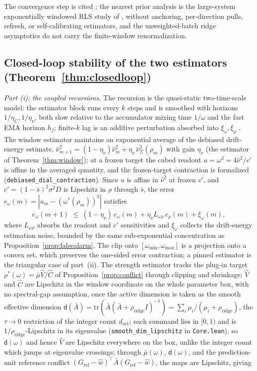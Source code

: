 The convergence step is cited \citep{silverstein1995,rubio2011,hachem2007}; the nearest prior analysis is the large-system exponentially windowed RLS study of \citet{xiao2005}, without anchoring, per-direction pulls, refresh, or self-calibrating estimators, and the unweighted-batch ridge asymptotics \citep{hastie2022,pafka2004} do not carry the finite-window renormalization.

\subsection{Closed-loop stability of the two estimators (Theorem~\ref{thm:closedloop})}

\emph{Part (i): the coupled recursions.}
The recursion is the quasi-static two-time-scale model: the estimator block runs every $k$ steps and is smoothed with horizons $1/\eta_C, 1/\eta_\nu$, both slow relative to the accumulator mixing time $1/\omega$ and the fast EMA horizon $h_f$; finite-$k$ lag is an additive perturbation absorbed into $\xi_\omega, \xi_\rho$ \citep{borkar2008,benveniste1990,kushner2003}.
The window estimator maintains an exponential average of the debiased drift-energy estimate, $\widehat\nu^2_{m+1} = (1-\eta_\nu)\widehat\nu^2_m + \eta_\nu\,\widehat\nu^2_\Sigma(\rho_m)$ with gain $\eta_\nu$ (the estimator of Theorem~\ref{thm:window}); at a frozen target the cubed readout $u = \omega^3 = 4\widehat\nu^2/c'$ is affine in the averaged quantity, and the frozen-target contraction is formalized (\texttt{debiased\_dial\_contraction}).
Since $u$ is affine in $\widehat\nu^2$ at frozen $c'$, and $c' = (1-\bar s)^2\sigma^2D$ is Lipschitz in $\rho$ through $\bar s$, the error $e_\omega(m) = |u_m - (\omega^*(\rho_m))^3|$ satisfies
\[
e_\omega(m{+}1) \;\le\; (1-\eta_\nu)\,e_\omega(m) + \eta_\nu L_{\omega\rho}\, e_\rho(m) + \xi_\omega(m),
\]
where $L_{\omega\rho}$ absorbs the readout and $c'$ sensitivities and $\xi_\omega$ collects the drift-energy estimation noise, bounded by the same sub-exponential concentration as Proposition~\ref{prop:falsealarm}.
The clip onto $[\omega_{\min}, \omega_{\max}]$ is a projection onto a convex set, which preserves the one-sided error contraction; a pinned estimator is the triangular case of part~(ii).
The strength estimator tracks the plug-in target $\rho^*(\omega) = \bar\mu\widehat V/\widehat C$ of Proposition~\ref{prop:conflict} through clipping and shrinkage; $\widehat V$ and $\widehat C$ are Lipschitz in the window coordinate on the whole parameter box, with no spectral-gap assumption, once the active dimension is taken as the smooth effective dimension $\mathsf d(\bar A) = \mathrm{tr}(\bar A(\bar A+\rho_{\mathrm{ridge}}I)^{-1}) = \sum_i \mu_i/(\mu_i+\rho_{\mathrm{ridge}})$, the $\tau \to 0$ restriction of the integer count $d_{\mathrm{act}}$; each summand lies in $[0,1)$ and is $1/\rho_{\mathrm{ridge}}$-Lipschitz in its eigenvalue (\texttt{smooth\_dim\_lipschitz} in \texttt{Core.lean}), so $\mathsf d(\omega)$ and hence $\widehat V$ are Lipschitz everywhere on the box, unlike the integer count which jumps at eigenvalue crossings; through $\bar\mu(\omega)$, $\mathsf d(\omega)$, and the prediction-unit reference conflict $(G_{\mathrm{ref}}-\widehat w)^\top\bar A(G_{\mathrm{ref}}-\widehat w)$, the maps are Lipschitz, giving

